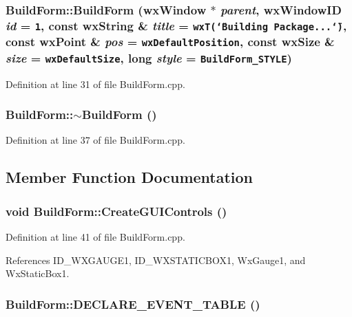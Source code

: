 \subsubsection{\setlength{\rightskip}{0pt plus 5cm}Build\-Form::Build\-Form (wx\-Window $\ast$ {\em parent}, wx\-Window\-ID {\em id} = {\tt 1}, const wx\-String \& {\em title} = {\tt wxT(\char`\"{}Building~Package...\char`\"{})}, const wx\-Point \& {\em pos} = {\tt wxDefaultPosition}, const wx\-Size \& {\em size} = {\tt wxDefaultSize}, long {\em style} = {\tt BuildForm\_\-STYLE})}\label{class_build_form_f70dc2200969dadfee3d7752e8e5e748}




Definition at line 31 of file Build\-Form.cpp.
\subsubsection{\setlength{\rightskip}{0pt plus 5cm}Build\-Form::$\sim$Build\-Form ()\hspace{0.3cm}{\tt  [virtual]}}\label{class_build_form_eb36e2e548aa91eb73c329e7eb8f9785}




Definition at line 37 of file Build\-Form.cpp.

\subsection{Member Function Documentation}
\subsubsection{\setlength{\rightskip}{0pt plus 5cm}void Build\-Form::Create\-GUIControls ()\hspace{0.3cm}{\tt  [private]}}\label{class_build_form_c4bd76a8d1a8fb59dda7ca8618197d59}




Definition at line 41 of file Build\-Form.cpp.

References ID\_\-WXGAUGE1, ID\_\-WXSTATICBOX1, Wx\-Gauge1, and Wx\-Static\-Box1.
\subsubsection{\setlength{\rightskip}{0pt plus 5cm}Build\-Form::DECLARE\_\-EVENT\_\-TABLE ()\hspace{0.3cm}{\tt  [private]}}\label{class_build_form_d019d8d68dd8a6dc8225459fbcc691cc}


